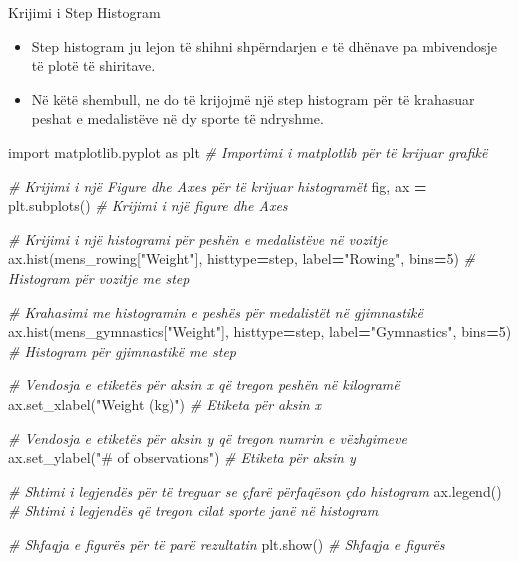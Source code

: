 \documentclass[
  ignorenonframetext,
]{beamer}
\newenvironment{Shaded}{\begin{snugshade}}{\end{snugshade}}
\newcommand{\CommentTok}[1]{\textcolor[rgb]{0.56,0.35,0.01}{\textit{#1}}}
\newcommand{\DecValTok}[1]{\textcolor[rgb]{0.00,0.00,0.81}{#1}}
\newcommand{\ImportTok}[1]{#1}
\newcommand{\NormalTok}[1]{#1}
\newcommand{\OperatorTok}[1]{\textcolor[rgb]{0.81,0.36,0.00}{\textbf{#1}}}
\newcommand{\StringTok}[1]{\textcolor[rgb]{0.31,0.60,0.02}{#1}}
\begin{document}
\begin{frame}[fragile]{Krijimi i Step Histogram}
\protect\hypertarget{krijimi-i-step-histogram-1}{}
\begin{itemize}
\item
  Step histogram ju lejon të shihni shpërndarjen e të dhënave pa
  mbivendosje të plotë të shiritave.
\item
  Në këtë shembull, ne do të krijojmë një step histogram për të
  krahasuar peshat e medalistëve në dy sporte të ndryshme.
\end{itemize}


\begin{Shaded}
\begin{Highlighting}[]
\ImportTok{import}\NormalTok{ matplotlib.pyplot }\ImportTok{as}\NormalTok{ plt  }\CommentTok{\# Importimi i matplotlib për të krijuar grafikë}

\CommentTok{\# Krijimi i një Figure dhe Axes për të krijuar histogramët}
\NormalTok{fig, ax }\OperatorTok{=}\NormalTok{ plt.subplots()  }\CommentTok{\# Krijimi i një figure dhe Axes}

\CommentTok{\# Krijimi i një histogrami për peshën e medalistëve në vozitje}
\NormalTok{ax.hist(mens\_rowing[}\StringTok{"Weight"}\NormalTok{], histtype}\OperatorTok{=}\StringTok{\textquotesingle{}step\textquotesingle{}}\NormalTok{, label}\OperatorTok{=}\StringTok{"Rowing"}\NormalTok{, bins}\OperatorTok{=}\DecValTok{5}\NormalTok{)  }\CommentTok{\# Histogram për vozitje me \textquotesingle{}step\textquotesingle{}}

\CommentTok{\# Krahasimi me histogramin e peshës për medalistët në gjimnastikë}
\NormalTok{ax.hist(mens\_gymnastics[}\StringTok{"Weight"}\NormalTok{], histtype}\OperatorTok{=}\StringTok{\textquotesingle{}step\textquotesingle{}}\NormalTok{, label}\OperatorTok{=}\StringTok{"Gymnastics"}\NormalTok{, bins}\OperatorTok{=}\DecValTok{5}\NormalTok{)  }\CommentTok{\# Histogram për gjimnastikë me \textquotesingle{}step\textquotesingle{}}

\CommentTok{\# Vendosja e etiketës për aksin x që tregon peshën në kilogramë}
\NormalTok{ax.set\_xlabel(}\StringTok{"Weight (kg)"}\NormalTok{)  }\CommentTok{\# Etiketa për aksin x}

\CommentTok{\# Vendosja e etiketës për aksin y që tregon numrin e vëzhgimeve}
\NormalTok{ax.set\_ylabel(}\StringTok{"\# of observations"}\NormalTok{)  }\CommentTok{\# Etiketa për aksin y}

\CommentTok{\# Shtimi i legjendës për të treguar se çfarë përfaqëson çdo histogram}
\NormalTok{ax.legend()  }\CommentTok{\# Shtimi i legjendës që tregon cilat sporte janë në histogram}

\CommentTok{\# Shfaqja e figurës për të parë rezultatin}
\NormalTok{plt.show()  }\CommentTok{\# Shfaqja e figurës}
\end{Highlighting}
\end{Shaded}
\end{frame}
\end{document}
